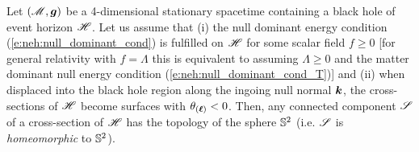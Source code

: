 \begin{prop}
\label{p:sta:topology1}
Let $(\mathscr{M}, \bm{g})$ be a 4-dimensional stationary spacetime
containing a black hole of event horizon $\mathscr{H}$.
Let us assume that
(i) the null dominant energy condition (\ref{e:neh:null_dominant_cond})
is fulfilled on $\mathscr{H}$ for some scalar field $f \geq 0$
[for general relativity with $f=\Lambda$
this is equivalent to assuming $\Lambda \geq 0$ and
the matter dominant null energy condition (\ref{e:neh:null_dominant_cond_T})]
and (ii) when
displaced into the black hole region along the ingoing null normal $\bm{k}$, the
cross-sections of $\mathscr{H}$ become surfaces with $\theta_{(\bm{\ell})} < 0$.
Then, any connected component $\mathscr{S}$ of a cross-section of $\mathscr{H}$
has the topology of the sphere $\mathbb{S}^2$ (i.e. $\mathscr{S}$ is
\emph{homeomorphic} to $\mathbb{S}^2$).
\end{prop}
